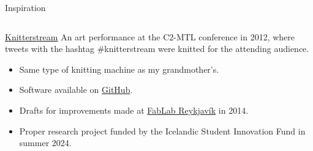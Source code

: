 \documentclass[
    NAME={Dr. Helga Ingimundardóttir},
    EMAIL={helgaingim@hi.is},
    FACULTY={Industrial Engineering},
    TITLE={HiDef Textiles: Reviving Tradition with Innovation},
    SUBTITLE={Empowering Creativity and Sustainability in Textile Production through Digital Transformation},
    SEMINAR={Reykjavík DataBeers},
    DATE={January 25, 2025},
    WIDE={true}
]{HI-LaTeX/hi-beamer}
\begin{document}
\begin{frame}{Inspiration}

    \begin{columns}
        \begin{column}{0.65\textwidth}
            \begin{alertblock}{\href{https://vimeo.com/58580261}{Knitterstream}}
                An art performance at the \alert{C2-MTL} conference in 2012, where tweets with the hashtag \alert{\#knitterstream} were knitted for the attending audience.
            \end{alertblock}

            \begin{itemize}
                \item Same type of knitting machine as my grandmother's.
                \item Software available on \href{https://github.com/borgstrom/KnitterStream/tree/master}{GitHub}.
                \item Drafts for improvements made at \href{https://web.archive.org/web/20150918225135/http://wiki.fablab.is/wiki/HiKnitterStream}{FabLab Reykjavík} in 2014.
                \item Proper research project funded by the \alert{Icelandic Student Innovation Fund} in summer 2024.
            \end{itemize}


\end{column}
\end{columns}
\end{frame}
\end{document}
